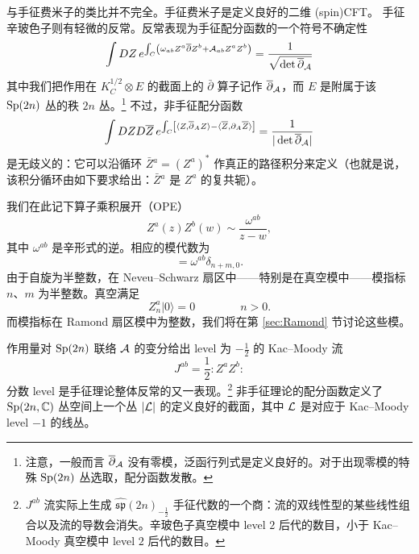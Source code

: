  与手征费米子的类比并不完全。手征费米子是定义良好的二维 (spin)CFT。
手征辛玻色子则有轻微的反常。反常表现为手征配分函数的一个符号不确定性
\begin{equation}
\int DZ \,e^{\int_{C}\left( \omega_{ab} Z^a \bar\partial Z^b + {\cal A}_{ab} Z^a Z^b\right)} = \frac{1}{\sqrt{\det \bar \partial_{\cal A} }}
\end{equation}
其中我们把作用在 $K_C^{1/2} \otimes E$ 的截面上的 $\bar \partial$ 算子记作 $\bar \partial_{\cal A}$，而 $E$ 是附属于该 $\Sp(2n)$ 丛的秩 $2n$ 丛。\footnote{注意，一般而言 $\bar \partial_{\cal A}$ 没有零模，泛函行列式是定义良好的。对于出现零模的特殊 $\Sp(2n)$ 丛选取，配分函数发散。} 
不过，非手征配分函数
\begin{equation}
\int DZ D\bar Z\, e^{\int_C \left[\langle Z, \bar \partial_A Z \rangle -  \langle 
\bar Z, \partial_A \bar Z \rangle\right]} =  \frac{1}{|\det \bar \partial_{\cal A} |}
\end{equation}
是无歧义的：它可以沿循环 $\bar Z{}^a = (Z^a)^*$ 作真正的路径积分来定义（也就是说，该积分循环由如下要求给出：$\bar Z{}^a$ 是 $Z^a$ 的复共轭）。

我们在此记下算子乘积展开（OPE）
\begin{equation}
Z^a(z) Z^b(w) \sim \frac{\omega^{ab}}{z-w},
\end{equation}
其中 $\omega^{ab}$ 是辛形式的逆。相应的模代数为 
\begin{equation}
[Z^a_m, Z^b_n] = \omega^{ab} \delta_{n+m,0}.
\end{equation}
由于自旋为半整数，在 Neveu–Schwarz 扇区中——特别是在真空模中——模指标 $n$、$m$ 为半整数。真空满足 
\begin{equation}
Z^a_n |0\rangle =0 \qquad \qquad n>0.
\end{equation}
而模指标在 Ramond 扇区模中为整数，我们将在第 \ref{sec:Ramond} 节讨论这些模。

作用量对 $\Sp(2n)$ 联络 ${\cal A}$ 的变分给出 level 为 $- \frac12$ 的 Kac–Moody 流
\begin{equation}
J^{ab} = \frac12 :Z^a Z^b:
\end{equation}
分数 level 是手征理论整体反常的又一表现。\footnote{$J^{ab}$ 流实际上生成 $\widehat{\mathfrak{sp}}(2n)_{-\frac12}$ 手征代数的一个商：流的双线性型的某些线性组合以及流的导数会消失。辛玻色子真空模中 level $2$ 后代的数目，小于 Kac–Moody 真空模中 level $2$ 后代的数目。} 非手征理论的配分函数定义了 $\Sp(2n,\C)$ 丛空间上一个丛 $|{\cal L}|$ 的定义良好的截面，其中 ${\cal L}$ 是对应于 Kac–Moody level $-1$ 的线丛。 

